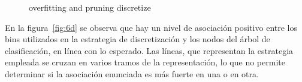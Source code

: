 \begin{figure}
  \centering
  \caption{overfitting and pruning discretize}
  \label{fig:overdis}
\end{figure}


En la figura~\ref{fig:6d} se observa que hay un nivel de asociación positivo entre los bins
utilizados en la estrategia de discretización y los nodos del árbol de clasificación, en línea
con lo esperado. Las líneas, que representan la estrategia empleada se cruzan en varios
tramos de la representación, lo que no permite determinar si la asociación enunciada es
más fuerte en una o en otra.

